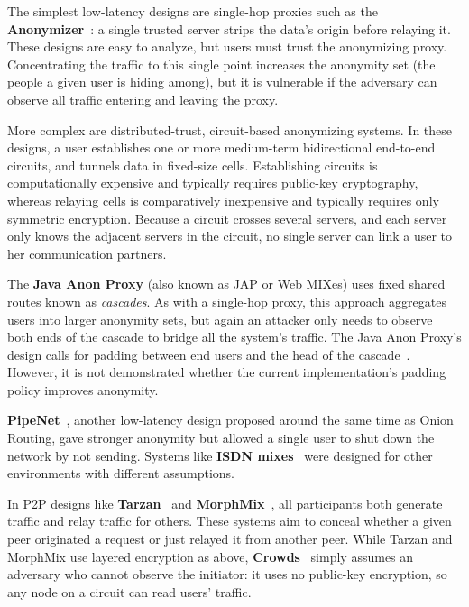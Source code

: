 \documentclass[twocolumn]{article}
\begin{document}
The simplest low-latency designs are single-hop proxies such as the
{\bf Anonymizer}~\cite{anonymizer}: a single trusted server strips the
data's origin before relaying it.  These designs are easy to
analyze, but users must trust the anonymizing proxy.
Concentrating the traffic to this single point increases the anonymity set
(the people a given user is hiding among), but it is vulnerable if the
adversary can observe all traffic entering and leaving the proxy.

More complex are distributed-trust, circuit-based anonymizing systems.
In these designs, a user establishes one or more medium-term bidirectional
end-to-end circuits, and tunnels data in fixed-size cells.
Establishing circuits is computationally expensive and typically
requires public-key
cryptography, whereas relaying cells is comparatively inexpensive and
typically requires only symmetric encryption.
Because a circuit crosses several servers, and each server only knows
the adjacent servers in the circuit, no single server can link a
user to her communication partners.

The {\bf Java Anon Proxy} (also known as JAP or Web MIXes) uses fixed shared
routes known as \emph{cascades}.  As with a single-hop proxy, this
approach aggregates users into larger anonymity sets, but again an
attacker only needs to observe both ends of the cascade to bridge all
the system's traffic.  The Java Anon Proxy's design
calls for padding between end users and the head of the
cascade~\cite{web-mix}. However, it is not demonstrated whether the current
implementation's padding policy improves anonymity.

{\bf PipeNet}~\cite{back01, pipenet}, another low-latency design proposed
around the same time as Onion Routing, gave
stronger anonymity but allowed a single user to shut
down the network by not sending. Systems like {\bf ISDN
mixes}~\cite{isdn-mixes} were designed for other environments with
different assumptions.

In P2P designs like {\bf Tarzan}~\cite{tarzan:ccs02} and
{\bf MorphMix}~\cite{morphmix:fc04}, all participants both generate
traffic and relay traffic for others. These systems aim to conceal
whether a given peer originated a request
or just relayed it from another peer. While Tarzan and MorphMix use
layered encryption as above, {\bf Crowds}~\cite{crowds-tissec} simply assumes
an adversary who cannot observe the initiator: it uses no public-key
encryption, so any node on a circuit can read users' traffic.
\end{document}
